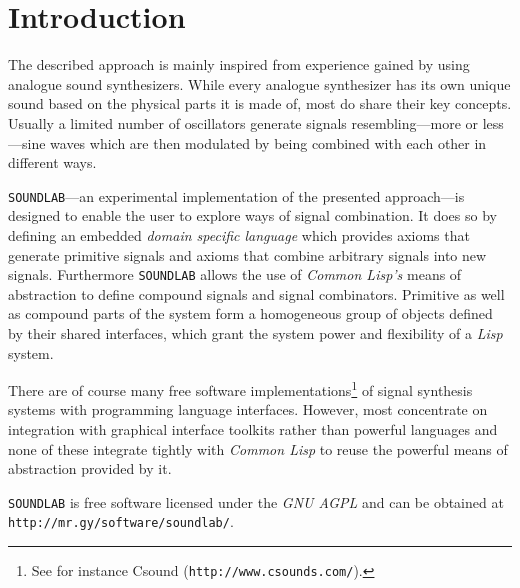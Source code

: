 \section{Introduction}

The described approach is mainly inspired from experience gained by using
analogue sound synthesizers. While every analogue synthesizer has its own
unique sound based on the physical parts it is made of, most do share
their key concepts. Usually a limited number of oscillators generate
signals resembling---more or less---sine waves which are then modulated
by being combined with each other in different ways.

\texttt{SOUNDLAB}---an experimental implementation of the presented
approach---is designed to enable the user to explore ways of signal
combination. It does so by defining an embedded \textit{domain specific
language} which provides axioms that generate primitive signals and
axioms that combine arbitrary signals into new signals. Furthermore
\texttt{SOUNDLAB} allows the use of \textit{Common Lisp's} means of
abstraction to define compound signals and signal combinators. Primitive
as well as compound parts of the system form a homogeneous group of
objects defined by their shared interfaces, which grant the system power
and flexibility of a \textit{Lisp} system.

There are of course many free software implementations\footnote{See for
instance Csound (\texttt{http://www.csounds.com/}).} of signal synthesis
systems with programming language interfaces. However, most concentrate
on integration with graphical interface toolkits rather than powerful
languages and none of these integrate tightly with \textit{Common Lisp}
to reuse the powerful means of abstraction provided by it.

\texttt{SOUNDLAB} is free software licensed under the \textit{GNU AGPL}
and can be obtained at \texttt{http://mr.gy/software/soundlab/}.
